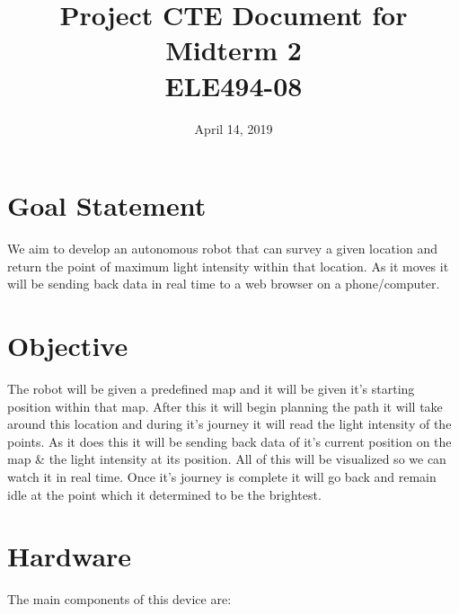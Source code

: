 \documentclass[conference]{IEEEtran}
\date{April 14, 2019}
\makeatletter
\let\thedate\@date
\makeatother
\begin{document}
 
    \title{
        Project CTE Document for Midterm 2\\[0.2cm]
        \large ELE494-08\\
        \large \thedate
    }

    \author{
    }

    \maketitle

    \section{Goal Statement}

    We aim to develop an autonomous robot that can survey a given location and return the point of
    maximum light intensity within that location. As it moves it will be sending back data in real
    time to a web browser on a phone/computer. 

    \section{Objective}

    The robot will be given a predefined map and it will be given it's starting position within that map.
    After this it will begin planning the path it will take around this location and during it's journey it
    will read the light intensity of the points. As it does this it will be sending back data of it's current
    position on the map \& the light intensity at its position. All of this will be visualized so we can watch
    it in real time. Once it's journey is complete it will go back and remain idle at the point which it determined
    to be the brightest.
 
    \section{Hardware}

    The main components of this device are:
\end{document}
